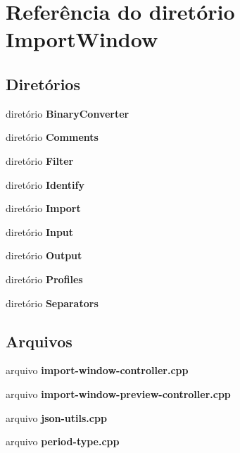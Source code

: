 \section{Referência do diretório Import\+Window}
\label{dir_7bf0b96d3892c88faaeb7146fc60aeba}
\subsection*{Diretórios}
\begin{DoxyCompactItemize}
\item 
diretório {\bf Binary\+Converter}
\item 
diretório {\bf Comments}
\item 
diretório {\bf Filter}
\item 
diretório {\bf Identify}
\item 
diretório {\bf Import}
\item 
diretório {\bf Input}
\item 
diretório {\bf Output}
\item 
diretório {\bf Profiles}
\item 
diretório {\bf Separators}
\end{DoxyCompactItemize}
\subsection*{Arquivos}
\begin{DoxyCompactItemize}
\item 
arquivo {\bf import-\/window-\/controller.\+cpp}
\item 
arquivo {\bf import-\/window-\/preview-\/controller.\+cpp}
\item 
arquivo {\bf json-\/utils.\+cpp}
\item 
arquivo {\bf period-\/type.\+cpp}
\end{DoxyCompactItemize}
